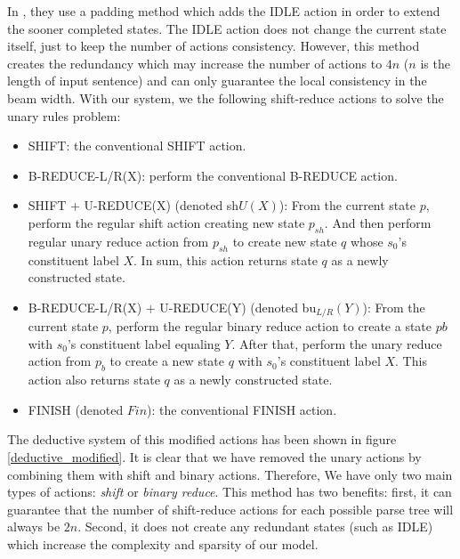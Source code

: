 In \cite{2012Zhu}, they use a padding method which adds the IDLE action in order to extend the sooner completed states. The IDLE action does not change the current state itself, just to keep the number of actions consistency. However, this method creates the redundancy which may increase the number of actions to $4n$ ($n$ is the length of input sentence) and can only guarantee the local consistency in the beam width. With our system, we the following shift-reduce actions to solve the unary rules problem: 
\begin{itemize}
	\item SHIFT: the conventional SHIFT action.
	\item B-REDUCE-L/R(X): perform the conventional B-REDUCE action.
	\item SHIFT + U-REDUCE(X) (denoted sh$U(X)$): From the current state $p$, perform the regular shift action creating new state $p_{sh}$. And then perform regular unary reduce action from $p_{sh}$ to create new state $q$ whose $s_0$'s constituent label $X$. In sum, this action returns state $q$ as a newly constructed state. 
	\item B-REDUCE-L/R(X) + U-REDUCE(Y) (denoted bu$_{L/R}(Y)$): From the current state $p$, perform the regular binary reduce action to create a state $p{b}$ with $s_0$'s constituent label equaling $Y$. After that, perform the unary reduce action from $p_{b}$ to create a new state $q$ with $s_0$'s constituent label $X$. This action also returns state $q$ as a newly constructed state.
	\item FINISH (denoted $Fin$): the conventional FINISH action.
\end{itemize}

The deductive system of this modified actions has been shown in figure \ref{deductive_modified}. It is clear that we have removed the unary actions by combining them with shift and binary actions. Therefore, We have only two main types of actions: \textit{shift} or \textit{binary reduce}. This method has two benefits: first, it can guarantee that the number of shift-reduce actions for each possible parse tree will always be $2n$. Second, it does not create any redundant states (such as IDLE) which increase the complexity and sparsity of our model.

